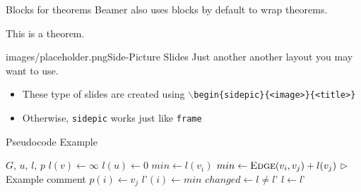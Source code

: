\begin{frame}[fragile]{Blocks for theorems}
Beamer also uses blocks by default to wrap theorems.
\begin{theorem} This is a theorem. \end{theorem}
\end{frame}


\begin{sidepic}{images/placeholder.png}{Side-Picture Slides}
Just another another layout you may want to use.
\begin{itemize}
\item These type of slides are created using \texttt{$\backslash$begin\{sidepic\}\{<image>\}\{<title>\}}
\item Otherwise, \texttt{sidepic} works just like \texttt{frame}
\end{itemize}
\end{sidepic}


\renewcommand{\algorithmicrequire}{\textbf{Input:}}
\renewcommand{\algorithmicensure}{\textbf{Output:}}
\newcommand*\CALL[2]{\textsc{#1}(#2)}
\newcommand*\ANNOTATE[1]{\hfill\(\triangleright\) #1}%

\footlinecolor{}

\begin{frame}[fragile]{Pseudocode Example}
\begin{algorithm}[H]
\fontsize{8}{1}\selectfont
\caption{Bellman-Kalaba (adapted from ).}
\begin{algorithmic}
\REQUIRE $G$, $u$, $l$, $p$
    \STATE $l(v) \leftarrow \infty$
\ENDFOR
\STATE $l(u) \leftarrow 0$
\REPEAT
        \STATE $min \leftarrow l(v_i)$
            \IF {$min > \CALL{Edge}{v_i, v_j} + l(v_j)$}
                \STATE $min \leftarrow \CALL{Edge}{v_i, v_j} + l(v_j)$ \ANNOTATE{Example comment}
                \STATE $p(i) \leftarrow v_j$
            \ENDIF
        \ENDFOR
        \STATE $l’(i) \leftarrow min$
    \ENDFOR
    \STATE $changed \leftarrow l \not= l’$
    \STATE $l \leftarrow l’$
\end{algorithmic}
\end{algorithm}
\end{frame}


